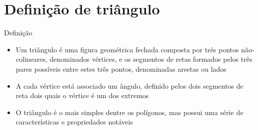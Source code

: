 \section{Definição de triângulo}

\begin{frame}[fragile]{Definição}

    \begin{itemize}
        \item Um triângulo é uma figura geométrica fechada composta por três pontos não-colineares, 
            denominados vértices, e os segmentos de retas formados pelos três pares possíveis entre 
            estes três pontos, denominadas arestas ou lados

        \item A cada vértice está associado um ângulo, definido pelos dois segmentos de reta
            dois quais o vértice é um dos extremos

        \item O triângulo é o mais simples dentre os polígonos, mas possui uma série de
            características e propriedades notáveis

    \end{itemize}

    \begin{figure}
        \centering


    \end{figure}
\end{frame}

